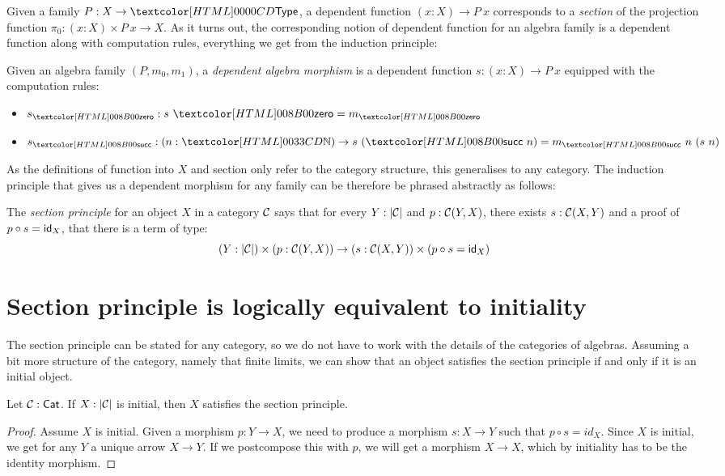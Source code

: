 Given a family $P : X \to \Type$, a dependent function
$(x : X) \to P\ x$ corresponds to a \emph{section} of the projection
function $\pi_0 : (x : X) \times P\ x \to X$. As it turns out, the
corresponding notion of dependent function for an algebra family is a
dependent function along with computation rules, \ie everything we get
from the induction principle:

\begin{definition}
  Given an algebra family $(P,m_0,m_1)$, a \emph{dependent algebra
    morphism} is a dependent function $s : (x : X) \to P\ x$ equipped
  with the computation rules:
  \begin{itemize}
  \item $s_{\natzero} : s\ \natzero = m_{\natzero}$
  \item $s_{\natsucc} : (n : \natty) \to s\ (\natsucc\ n) = m_{\natsucc}\ n\ (s\ n)$
  \end{itemize}
\end{definition}

As the definitions of function into $X$ and section only refer to the
category structure, this generalises to any category. The induction
principle that gives us a dependent morphism for any family can be
therefore be phrased abstractly as follows:

\begin{definition}
  The \emph{section principle} for an object $X$ in a category $\mathcal{C}$
  says that for every $Y : | \mathcal{C} |$ and $p : \mathcal{C}(Y,X)$, there exists
  $s : \mathcal{C}(X,Y)$ and a proof of $p \circ s = \mathsf{id}_X$, \ie that there is
  a term of type:
  \[
    (Y : | \mathcal{C} |) \times (p : \mathcal{C}(Y,X)) \to (s : \mathcal{C}(X,Y)) \times (p \circ s = \mathsf{id}_X)
  \]
\end{definition}

\section{Section principle is logically equivalent to initiality}

The section principle can be stated for any category, so we do not
have to work with the details of the categories of algebras. Assuming
a bit more structure of the category, namely that finite limits, we
can show that an object satisfies the section principle if and only if
it is an initial object.

\begin{lemma}
\label{thm:initToSec}
  Let $\mathcal{C}: \mathsf{Cat}$. If $X : | \mathcal{C} |$ is initial, then $X$ satisfies the
  section principle.
\end{lemma}
\begin{proof}
  Assume $X$ is initial. Given a morphism $p : Y \to X$, we need to
  produce a morphism $s : X \to Y$ such that $p \circ s = id_X$.
  Since $X$ is initial, we get for any $Y$ a unique arrow $X \to
  Y$. If we postcompose this with $p$, we will get a morphism
  $X \to X$, which by initiality has to be the identity morphism.
\end{proof}

